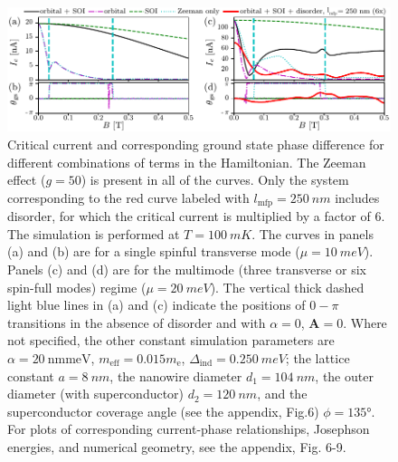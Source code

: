 \begin{figure}
\begin{center}
\includegraphics[width=0.7\columnwidth]{chapter_supercurrent/figures/fig4.pdf}
\caption{Critical current and corresponding ground state phase difference for different combinations of terms in the Hamiltonian.
The Zeeman effect ($g=50$) is present in all of the curves.
Only the system corresponding to the red curve labeled with $l_\textrm{mfp}=\SI{250}{nm}$ includes disorder, for which the critical current is multiplied by a factor of 6. The simulation is performed at $T=\SI{100}{mK}$.
The curves in panels (a) and (b) are for a single spinful transverse mode ($\mu=\SI{10}{meV}$).
Panels (c) and (d) are for the multimode (three transverse or six spin-full modes) regime ($\mu=\SI{20}{meV}$).
The vertical thick dashed light blue lines in (a) and (c) indicate the positions of $0-\pi$ transitions in the absence of disorder and with $\alpha = 0$, $\mathbf{A}=0$.
Where not specified, the other constant simulation parameters are $\alpha=\SI{20}{\nm \meV}$, $m_\textrm{eff}=0.015 m_\textrm{e}$, $\Delta_\textrm{ind}=\SI{0.250}{meV}$; the lattice constant $a=\SI{8}{nm}$, the nanowire diameter $d_1=\SI{104}{nm}$, the outer diameter (with superconductor) $d_2=\SI{120}{nm}$, and the superconductor coverage angle (see the appendix, Fig.6) $\phi=135\si{\degree}$. For plots of corresponding current-phase relationships, Josephson energies, and numerical geometry, see the appendix, Fig. 6-9.
}
\label{fig:critical_currents}
\end{center}
\end{figure}

